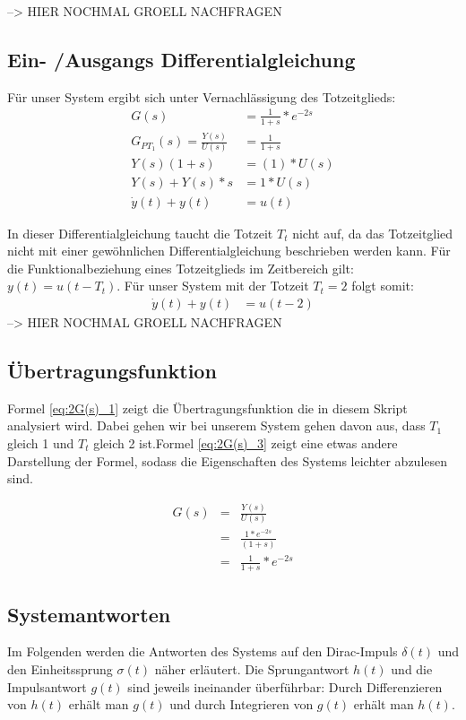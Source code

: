 --> HIER NOCHMAL GROELL NACHFRAGEN

\subsection{Ein- /Ausgangs Differentialgleichung}
Für unser System ergibt sich unter Vernachlässigung des Totzeitglieds:
\begin{align*}
    G(s) &= \frac{1}{1 + s} * e^{-2s}\\
G_{PT_1}(s) =\frac{Y(s)}{U(s)} &= \frac{1}{1 + s} \\
Y(s)(1+s) &= (1) * U(s) \\
Y(s) + Y(s) *s &= 1*U(s) \\
\dot y(t) + y(t) &= u(t) 
\end{align*}

In dieser Differentialgleichung taucht die Totzeit $T_t$ nicht auf, da das Totzeitglied nicht mit einer gewöhnlichen Differentialgleichung beschrieben werden kann. Für die Funktionalbeziehung eines Totzeitglieds im Zeitbereich gilt: $y(t) = u(t-T_t)$. Für unser System mit der Totzeit $T_t = 2$ folgt somit:
\begin{align*}
    \dot y(t) + y(t) &= u(t - 2) 
\end{align*}
--> HIER NOCHMAL GROELL NACHFRAGEN



\subsection{Übertragungsfunktion}

Formel \ref{eq:2G(s)_1} zeigt die Übertragungsfunktion die in diesem Skript analysiert wird. Dabei gehen wir bei unserem System gehen davon aus, dass $T_1$ gleich 1 und $T_t$ gleich 2 ist.Formel \ref{eq:2G(s)_3} zeigt eine etwas andere Darstellung der Formel, sodass die Eigenschaften des Systems leichter abzulesen sind.

\begin{eqnarray}
    \label{eq:2G(s)_1}
    G(s) &=& \frac{Y(s)}{U(s)} \\
    \label{eq:2G(s)_2}
    &=& \frac{1 * e^{-2s}}{(1+s)} \\
    \label{eq:2G(s)_3}
    &=& \frac{1}{1 + s} * e^{-2s}
\end{eqnarray}

\subsection{Systemantworten}
Im Folgenden werden die Antworten des Systems auf den Dirac-Impuls $\delta(t)$ und den Einheitssprung $\sigma (t)$ näher erläutert.
Die Sprungantwort $h(t)$ und die Impulsantwort $g(t)$ sind jeweils ineinander überführbar: Durch Differenzieren von $h(t)$ erhält man $g(t)$ und durch Integrieren von $g(t)$ erhält man $h(t)$.
